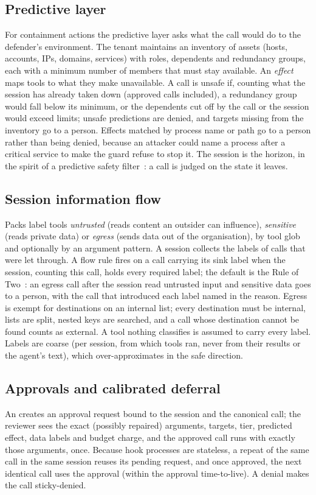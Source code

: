 \subsection{Predictive layer}
For containment actions the predictive layer asks what the call would do to the defender's environment. The tenant maintains an inventory of assets (hosts, accounts, IPs, domains, services) with roles, dependents and redundancy groups, each with a minimum number of members that must stay available. An \emph{effect} maps tools to what they make unavailable. A call is unsafe if, counting what the session has already taken down (approved calls included), a redundancy group would fall below its minimum, or the dependents cut off by the call or the session would exceed limits; unsafe predictions are denied, and targets missing from the inventory go to a person. Effects matched by process name or path go to a person rather than being denied, because an attacker could name a process after a critical service to make the guard refuse to stop it. The session is the horizon, in the spirit of a predictive safety filter~\cite{wabersich}: a call is judged on the state it leaves.

\subsection{Session information flow}
Packs label tools \emph{untrusted} (reads content an outsider can influence), \emph{sensitive} (reads private data) or \emph{egress} (sends data out of the organisation), by tool glob and optionally by an argument pattern. A session collects the labels of calls that were let through. A flow rule fires on a call carrying its sink label when the session, counting this call, holds every required label; the default is the Rule of Two~\cite{ruleoftwo}: an egress call after the session read untrusted input and sensitive data goes to a person, with the call that introduced each label named in the reason. Egress is exempt for destinations on an internal list; every destination must be internal, lists are split, nested keys are searched, and a call whose destination cannot be found counts as external. A tool nothing classifies is assumed to carry every label. Labels are coarse (per session, from which tools ran, never from their results or the agent's text), which over-approximates in the safe direction.

\subsection{Approvals and calibrated deferral}
An  creates an approval request bound to the session and the canonical call; the reviewer sees the exact (possibly repaired) arguments, targets, tier, predicted effect, data labels and budget charge, and the approved call runs with exactly those arguments, once. Because hook processes are stateless, a repeat of the same call in the same session reuses its pending request, and once approved, the next identical call uses the approval (within the approval time-to-live). A denial makes the call sticky-denied.

